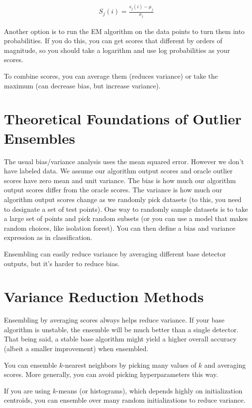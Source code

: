 \documentclass[a4paper]{article}
\begin{document}
\begin{align}
  S_j(i) = \frac{s_j(i) - \mu_j}{\sigma_j}
\end{align}

Another option is to run the EM algorithm on the data points to turn them
into probabilities. If you do this, you can get scores that different by
orders of magnitude, so you should take a logarithm and use log
probabilities as your scores.

To combine scores, you can average them (reduces variance) or take the
maximum (can decrease bias, but increase variance).

\section{Theoretical Foundations of Outlier Ensembles}
The usual bias/variance analysis uses the mean squared error. However we
don't have labeled data. We assume our algorithm output scores
and oracle outlier scores have zero mean and unit variance. The bias is how
much our algorithm output scores differ from the oracle scores. The variance
is how much our algorithm output scores change as we randomly pick datasets
(to this, you need to designate a set of test points). One way to randomly
sample datasets is to take a large set of points and pick random subsets (or
you can use a model that makes random choices, like isolation forest). You
can then define a bias and variance expression as in classification.

Ensembling can easily reduce variance by averaging different base detector
outputs, but it's harder to reduce bias.

\section{Variance Reduction Methods}
Ensembling by averaging scores always helps reduce variance. If your
base algorithm is unstable, the ensemble will be much better than a single
detector. That being said, a stable base algorithm might yield a higher
overall accuracy (albeit a smaller improvement) when ensembled.

You can ensemble $k$-nearest neighbors by picking many values of $k$ and
averaging scores. More generally, you can avoid picking hyperparameters this
way.

If you are using $k$-means (or histograms), which depends highly on
initialization centroids, you can ensemble over many random initializations
to reduce variance.
\end{document}
